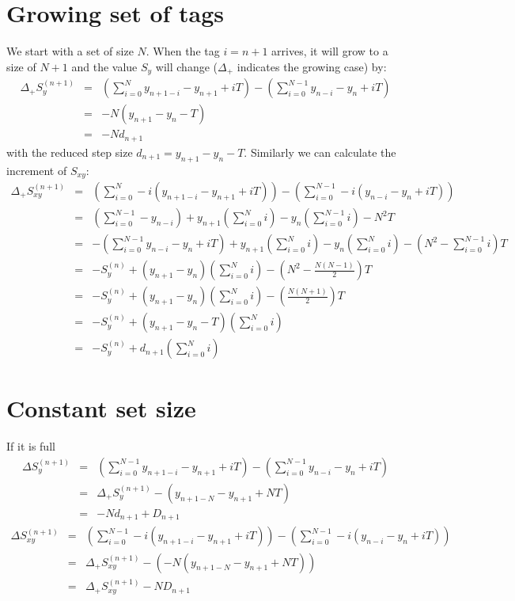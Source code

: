\documentclass[]{scrreprt}
\begin{document}
\section{Growing set of tags}
We start with a set of size $N$. When the tag $i=n+1$ arrives, it will grow to a size of $N+1$ and the value $S_y$ will change ($\Delta_+$ indicates the growing case) by:
\begin{eqnarray}
    \Delta_+ S_y^{(n+1)} &=& \left(\sum_{i=0}^N y_{n + 1 - i} - y_{n+1} + i T\right) - \left(\sum_{i=0}^{N-1} y_{n - i} - y_n + i T\right) \nonumber \\
    &=& - N \left(y_{n+1} - y_n - T\right) \nonumber \\
    &=& - N d_{n+1}
\end{eqnarray}
with the reduced step size $d_{n+1} = y_{n+1} - y_n - T$. Similarly we can calculate the increment of $S_{xy}$:
\begin{eqnarray}
    \Delta_+ S_{xy}^{(n+1)} &=& \left(\sum_{i=0}^N -i \left(y_{n + 1 - i} - y_{n+1} + i T\right)\right) - \left(\sum_{i=0}^{N-1} -i \left(y_{n - i} - y_n + i T\right)\right) \nonumber \\
    &=& \left(\sum_{i=0}^{N-1}-y_{n-i}\right) + y_{n+1} \left(\sum_{i=0}^N i\right) - y_n \left(\sum_{i=0}^{N-1} i\right) - N^2 T \nonumber \\
    &=& -\left(\sum_{i=0}^{N-1} y_{n-i} - y_n + iT\right) + y_{n+1} \left(\sum_{i=0}^N i\right) - y_n \left(\sum_{i=0}^N i\right) - \left(N^2 - \sum_{i=0}^{N-1} i\right) T \nonumber \\
    &=& -S_y^{(n)} + \left(y_{n+1} - y_n\right) \left(\sum_{i=0}^N i\right) - \left(N^2 - \frac{N(N-1)}{2}\right) T \nonumber \\
    &=& -S_y^{(n)} + \left(y_{n+1} - y_n\right) \left(\sum_{i=0}^N i\right) - \left(\frac{N(N+1)}{2}\right) T \nonumber \\
    &=& -S_y^{(n)} + \left(y_{n+1} - y_n - T\right) \left(\sum_{i=0}^N i\right) \nonumber \\
    &=& -S_y^{(n)} + d_{n+1} \left(\sum_{i=0}^N i\right)
\end{eqnarray}

\section{Constant set size}
If it is full
\begin{eqnarray}
    \Delta S_y^{(n+1)} &=& \left(\sum_{i=0}^{N-1} y_{n + 1 - i} - y_{n+1} + i T\right) - \left(\sum_{i=0}^{N-1} y_{n - i} - y_n + i T\right) \nonumber \\
    &=& \Delta_+ S_y^{(n+1)} - \left(y_{n+1-N} - y_{n+1} + NT\right) \nonumber \\
    &=& - N d_{n+1} + D_{n+1}
\end{eqnarray}
\begin{eqnarray}
    \Delta S_{xy}^{(n+1)} &=& \left(\sum_{i=0}^{N-1} -i \left(y_{n+1-i} - y_{n+1} + i T\right)\right) - \left(\sum_{i=0}^{N-1} -i \left(y_{n - i} - y_n + i T\right)\right) \nonumber \\
    &=& \Delta_+ S_{xy}^{(n+1)} - \left(-N\left(y_{n+1-N} - y_{n+1} + NT\right)\right) \nonumber \\
    &=& \Delta_+ S_{xy}^{(n+1)} - N D_{n+1}
\end{eqnarray}
\end{document}
